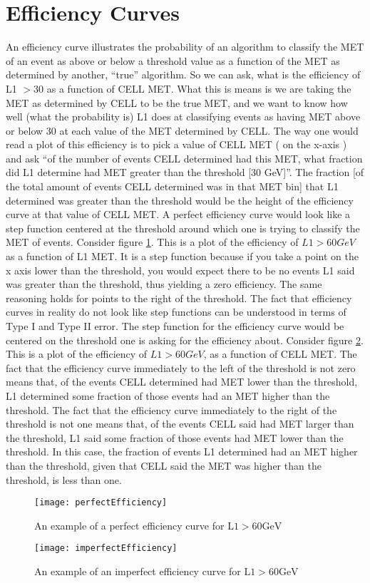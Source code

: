 \section{Efficiency Curves}
An efficiency curve illustrates the probability of an algorithm to classify the MET of an event as above or below a threshold value as a function of the MET as determined by another, ``true'' algorithm. 
So we can ask, what is the efficiency of L1 $> 30$ as a function of CELL MET. What this is means is we are taking the MET as determined by CELL to be the true MET, and we want to know how well (what the probability is) L1 does at classifying events as having MET above or below $30$ at each value of the MET determined by CELL. 
The way one would read a plot of this efficiency is to pick a value of CELL MET ( on the x-axis ) and ask ``of the number of events CELL determined had this MET, what fraction did L1 determine had MET greater than the threshold [30 GeV]''. 
The fraction [of the total amount of events CELL determined was in that MET bin] that L1 determined was greater than the threshold would be the height of the efficiency curve at that value of CELL MET.
A perfect efficiency curve would look like a step function centered at the threshold around which one is trying to classify the MET of events. Consider figure \ref{perfEff}. This is a plot of the efficiency of $L1>60 GeV$ as a function of L1 MET. It is a step function because if you take a point on the x axis lower than the threshold, you would expect there to be no events L1 said was greater than the threshold, thus yielding a zero efficiency. The same reasoning holds for points to the right of the threshold.
The fact that efficiency curves in reality do not look like step functions can be understood in terms of Type I and Type II error. 
The step function for the efficiency curve would be centered on the threshold one is asking for the efficiency about. Consider figure \ref{imperfEff}. This is a plot of the efficiency of $L1>60 GeV$, as a function of CELL MET.
The fact that the efficiency curve immediately to the left of the threshold is not zero means that, of the events CELL determined had MET lower than the threshold, L1 determined some fraction of those events had an MET higher than the threshold. 
The fact that the efficiency curve immediately to the right of the threshold is not one means that, of the events CELL said had MET larger than the threshold, L1 said some fraction of those events had MET lower than the threshold. 
In this case, the fraction of events L1 determined had an MET higher than the threshold, given that CELL said the MET was higher than the threshold, is less than one.
\pagebreak
\begin{figure}[h]
        \centering
        \texttt{[image: perfectEfficiency]}
        \caption{An example of a perfect efficiency curve for $\textrm{L1}>60\textrm{GeV}$}
        \label{perfEff}
\end{figure}
\begin{figure}[h]
        \centering
        \texttt{[image: imperfectEfficiency]}
        \caption{An example of an imperfect efficiency curve for $\textrm{L1}>60\textrm{GeV}$}
        \label{imperfEff}
\end{figure}
